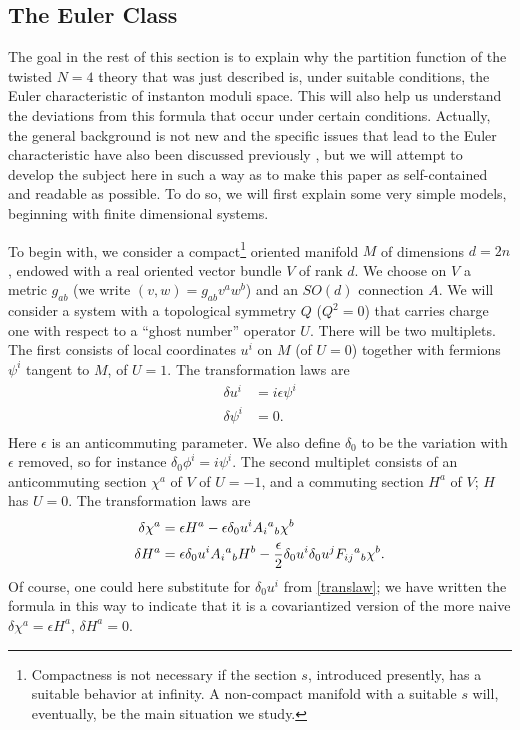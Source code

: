 \documentclass[12pt]{article}
\numberwithin{equation}{section}
\begin{document}
\subsection{The Euler Class}
The goal in the rest of this
section is to explain why the partition function
of the twisted $N=4$ theory that was just described is,
under suitable conditions, the Euler characteristic of instanton moduli
space.  This will also help us understand the deviations from this formula
that occur under certain conditions.  Actually, the general background
is not new \cite{mq,atj,bs,ugmit} and the specific issues that lead
to the Euler characteristic have also been discussed previously
\cite{oldwit,distler,cgm,thbl}, but we will
attempt to develop the subject here in such a way as to make this paper
as self-contained and readable as possible.  To do so, we will first
explain some very simple models, beginning with finite dimensional systems.

To begin with, we consider a compact\footnote{Compactness is not
  necessary if the section $s$, introduced presently, has a suitable
  behavior at infinity.  A non-compact manifold with a suitable $s$
will, eventually, be the main situation we study.}
oriented manifold $M$ of dimensions
$d=2n$, endowed with a real oriented
vector bundle $V$ of rank $d$.
We choose on $V$ a metric $g_{ab}$ (we write $(v,w)=g_{ab}v^aw^b$)
and an  $SO(d)$ connection $A$.
We will consider a system
with a topological symmetry $Q$ ($Q^2=0$) that carries charge
one with respect to a ``ghost number'' operator $U$.  There will be two
multiplets.  The first consists of local coordinates $u^i$ on $M$
(of $U=0$) together with fermions $\psi^i$ tangent to $M$, of $U=1$.
The transformation laws are
\begin{equation}
  \label{translaw}
  \begin{aligned}
    \delta u^i & = i\epsilon\psi^i \\
    \delta\psi^i & = 0.\\
  \end{aligned}
\end{equation}
Here $\epsilon$ is an anticommuting parameter.  We also define
$\delta_0$ to be the variation with $\epsilon $ removed, so for instance
$\delta_0\phi^i=i\psi^i$.
The second multiplet consists of an anticommuting section $\chi^a$ of $V$
of $U=-1$, and a commuting section $H^a$ of $V$; $H$ has $U=0$.
The transformation laws are
\begin{equation}
  \label{otherlaw}
  \begin{aligned}
    \delta \chi^a & =  \epsilon H^a-\epsilon\delta_0 u^iA_i{}^a{}_b\chi^b\\
    \delta H^a    & =\epsilon\delta_0 u^i A_i{}^a{}_bH^b
    -{\epsilon\over 2}\delta_0 u^i\delta_0 u^j F_{ij}{}^a{}_b \chi^b. \\
  \end{aligned}
\end{equation}
Of course, one could here substitute for $\delta_0 u^i$ from \eqref{translaw};
we have written the formula in this way to indicate that it is
a covariantized version of the more naive $\delta\chi^a=\epsilon H^a,\,
\delta H^a=0$.
\end{document}
